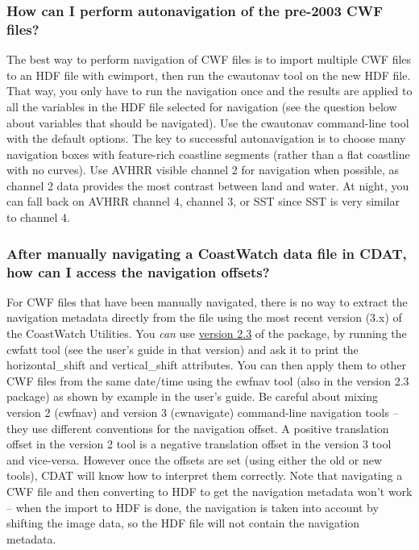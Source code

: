 \subsubsection*{How can I perform autonavigation of the pre-2003 CWF files?}

The best way to perform navigation of CWF files is to import multiple
CWF files to an HDF file with cwimport, then run the cwautonav tool on
the new HDF file.  That way, you only have to run the navigation once
and the results are applied to all the variables in the HDF file
selected for navigation (see the question below about variables that
should be navigated).  Use the cwautonav command-line tool with the
default options.  The key to successful autonavigation is to choose
many navigation boxes with feature-rich coastline segments (rather
than a flat coastline with no curves).  Use AVHRR visible channel 2
for navigation when possible, as channel 2 data provides the most
contrast between land and water.  At night, you can fall back on AVHRR
channel 4, channel 3, or SST since SST is very similar to channel 4.

\subsubsection*{After manually navigating a CoastWatch data file in CDAT, how can I access the navigation offsets?}

For CWF files that have been manually navigated, there is no way to
extract the navigation metadata directly from the file using the most
recent version (3.x) of the CoastWatch Utilities.  You {\em can} use
\href{http://coastwatch.noaa.gov/cw_cwfv2.html}{version 2.3} of the
package, by running the cwfatt tool (see the user's guide in that
version) and ask it to print the {\file horizontal\_shift} and {\file
vertical\_shift} attributes.  You can then apply them to other CWF
files from the same date/time using the cwfnav tool (also in the
version 2.3 package) as shown by example in the user's guide.  Be
careful about mixing version 2 (cwfnav) and version 3 (cwnavigate)
command-line navigation tools -- they use different conventions for
the navigation offset.  A positive translation offset in the version 2
tool is a negative translation offset in the version 3 tool and
vice-versa.  However once the offsets are set (using either the old or
new tools), CDAT will know how to interpret them correctly.  Note that
navigating a CWF file and then converting to HDF to get the navigation
metadata won't work -- when the import to HDF is done, the navigation
is taken into account by shifting the image data, so the HDF file will
not contain the navigation metadata.


